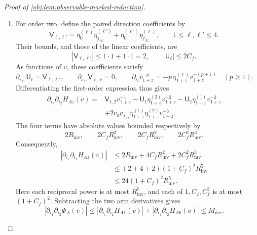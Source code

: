 \documentclass[11pt]{article}
\begin{document}
\begin{proof}[Proof of \cref{obj:lem:observable-marked-reduction}]
\begin{enumerate}
\item For order two, define the paired direction coefficients by
\[
\mathsf V_{\ell,\ell'}
=\eta^{(\ell)}_0\eta^{(\ell')}_{j_{Az}}
 +\eta^{(\ell')}_0\eta^{(\ell)}_{j_{Az}},
\qquad 1\le\ell,\ell'\le4.
\]
Their bounds, and those of the linear coefficients, are
\[
|\mathsf V_{\ell,\ell'}|
\le1\cdot1+1\cdot1=2,
\qquad
|\mathsf U_\ell|\le2C_f.
\]
As functions of \(v\), these coefficients satisfy
\[
\partial_{i_{\ell'}}\mathsf U_\ell
=\mathsf V_{\ell,\ell'},
\qquad
\partial_{i_{\ell'}}\mathsf V_{\ell,\nu}=0,
\qquad
\partial_{i_\ell}v_{1+z}^{-p}
=-p\,\eta^{(\ell)}_{1+z}v_{1+z}^{-(p+1)}
\quad(p\ge1).
\]
Differentiating the first-order expression thus gives
\[
\begin{aligned}
\partial_{i_1}\partial_{i_2}H_{Az}(v)
={}&\mathsf V_{1,2}v_{1+z}^{-1}
-\mathsf U_1\eta^{(2)}_{1+z}v_{1+z}^{-2}
-\mathsf U_2\eta^{(1)}_{1+z}v_{1+z}^{-2}\\
&+2v_0v_{j_{Az}}\eta^{(1)}_{1+z}
                      \eta^{(2)}_{1+z}v_{1+z}^{-3}.
\end{aligned}
\]
The four terms have absolute values bounded respectively by
\[
2R_{\mathrm{inv}},\qquad
2C_fR_{\mathrm{inv}}^2,\qquad
2C_fR_{\mathrm{inv}}^2,\qquad
2C_f^2R_{\mathrm{inv}}^3.
\]
Consequently,
\[
\begin{aligned}
|\partial_{i_1}\partial_{i_2}H_{Az}(v)|
&\le2R_{\mathrm{inv}}
    +4C_fR_{\mathrm{inv}}^2
    +2C_f^2R_{\mathrm{inv}}^3\\
&\le(2+4+2)(1+C_f)^2R_{\mathrm{inv}}^5\\
&\le24(1+C_f)^2R_{\mathrm{inv}}^5.
\end{aligned}
\]
Here each reciprocal power is at most \(R_{\mathrm{inv}}^5\), and each of
\(1,C_f,C_f^2\) is at most \((1+C_f)^2\). Subtracting the two arm derivatives gives
\[
|\partial_{i_1}\partial_{i_2}\Phi_A(v)|
\le|\partial_{i_1}\partial_{i_2}H_{A1}(v)|
  +|\partial_{i_1}\partial_{i_2}H_{A0}(v)|
\le M_{\mathrm{der}}.
\]


\end{enumerate}
\end{proof}
\end{document}
